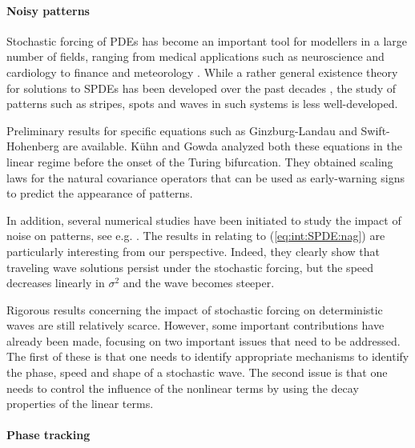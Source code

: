 \documentclass[10pt]{articleHJ}
\newcommand{\s}{\ensuremath{\sigma}}
\newcommand{\sref}[1]{(\ref{#1})}                       %
\numberwithin{equation}{section}
\begin{document}
\paragraph{Noisy patterns}
Stochastic forcing of PDEs has become an important tool for modellers in a
large number of
fields, ranging from medical applications such as neuroscience
\cite{Bressloff,bressloff2015nonlinear}
and cardiology \cite{Zhang} to
finance \cite{NunnoAdvMathFinance2011}
and meteorology \cite{Climate}.
While a rather general existence theory for
solutions to SPDEs has been developed over the past decades
\cite{Chow,Concise,Gawarecki,DaPratoZab},
the study of patterns such as stripes, spots and waves in
such systems is less well-developed.

Preliminary results for specific
equations such as Ginzburg-Landau
\cite{brassesco1995brownian,funaki1995scaling}
and Swift-Hohenberg \cite{Kuske2017} are available.
K\"uhn and Gowda \cite{gowda2015early} analyzed
both these equations in the linear regime before the onset
of the Turing bifurcation. They obtained
scaling laws for the natural covariance operators
that can be used as early-warning signs to predict the appearance of patterns.

In addition, several numerical studies
have been initiated to study the impact of noise on patterns,
see e.g. \cite{vinals1991numerical,Lord2012,Shardlow}.
The results in \cite{Lord2012} relating to
\sref{eq:int:SPDE:nag} are particularly interesting
from our perspective.
Indeed, they clearly show that traveling wave solutions
persist under the stochastic forcing, but the speed decreases
linearly in $\s^2$ and the wave becomes steeper.


Rigorous results concerning the impact of stochastic forcing on deterministic waves
are still relatively scarce. However, some important contributions have already been made,
focusing on two important issues that need to be addressed.
The first of these is that one needs to identify appropriate mechanisms
to identify the phase, speed and shape of a stochastic wave.
The second issue is that one needs to control the influence of the nonlinear
terms by using the decay properties of the linear terms.

\paragraph{Phase tracking}
\end{document}
